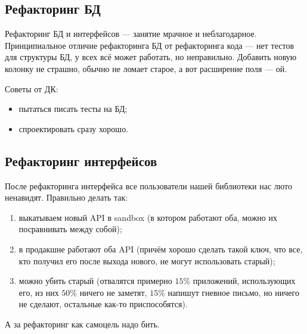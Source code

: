 \documentclass[11pt,a4paper]{article}
\begin{document}
\subsection{Рефакторинг БД}
Рефакторинг БД и интерфейсов — занятие мрачное и неблагодарное. Принципиальное отличие рефакторинга БД от рефакторинга кода — нет тестов для структуры БД, у всех всё может работать, но неправильно. Добавить новую колонку не страшно, обычно не ломает старое, а вот расширение поля — ой.

Советы от ДК:
\begin{itemize}
\item пытаться писать тесты на БД;
\item спроектировать сразу хорошо.
\end{itemize}

\subsection{Рефакторинг интерфейсов}
После рефакторинга интерфейса все пользователи нашей библиотеки нас люто ненавидят. Правильно делать так: 

\begin{enumerate}
\item выкатываем новый API в sandbox (в котором работают оба, можно их посравнивать между собой);
\item в продакшне работают оба API (причём хорошо сделать такой ключ, что все, кто получил его после выхода нового, не могут использовать старый);
\item можно убить старый (отвалятся примерно $15\%$ приложений, использующих его, из них $50\%$ ничего не заметят, $15\%$ напишут гневное письмо, но ничего не сделают, остальные как-то приспособятся).
\end{enumerate}

А за рефакторинг как самоцель надо бить.
\end{document}
